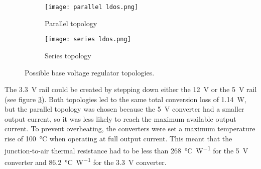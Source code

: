 \begin{figure}[htb]
	\centering
	\begin{subfigure}[b]{0.35\linewidth}
		\texttt{[image: parallel ldos.png]}
		\caption{Parallel topology}
		\label{fig: parallel ldos}
	\end{subfigure}
	\begin{subfigure}[b]{0.5\linewidth}
		\texttt{[image: series ldos.png]}
		\caption{Series topology}
		\label{fig: series ldos}
	\end{subfigure}
	\caption{Possible base voltage regulator topologies.}
	\label{fig: base ldos}
\end{figure}

The \SI{3.3}{\volt} rail could be created by stepping down either the \SI{12}{\volt} or the \SI{5}{\volt} rail (see figure \ref{fig: base ldos}). Both topologies led to the same total conversion loss of \SI{1.14}{\watt}, but the parallel topology was chosen because the \SI{5}{\volt} converter had a smaller output current, so it was less likely to reach the maximum available output current. To prevent overheating, the converters were set a maximum temperature rise of \SI{100}{\celsius} when operating at full output current. This meant that the junction-to-air thermal resistance had to be less than \SI{268}{\celsius\per\watt} for the \SI{5}{\volt} converter and \SI{86.2}{\celsius\per\watt} for the \SI{3.3}{\volt} converter. 

